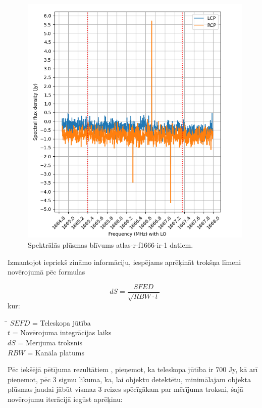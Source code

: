 \begin{figure}[H]
\centering
\includegraphics[width=\textwidth]{images/created/atlas-r-1-flux.png}
\caption{Spektrālās plūsmas blīvums atlas-r-f1666-ir-1 datiem.}
\label{fig:atlas-1-flux}
\end{figure}



Izmantojot iepriekš zināmo informāciju, iespējams aprēķināt trokšņa līmeni novērojumā pēc formulas


\begin{equation}
dS = \frac{SFED}{\sqrt{RBW \cdot t}} \tag{2.3.1}\label{eq:2.3.1} 
\end{equation}
kur: 
\begin{tabbing}
\phantom{\hspace{15mm}}\= \kill
$SEFD$\> = Teleskopa jūtība \\
$t$\>   = Novērojuma integrācijas laiks \\
$dS$\>   = Mērījuma troksnis \\
$RBW$\> = Kanāla platums\\

\end{tabbing}

Pēc iekšējā pētījuma rezultātiem \cite{telescope-sefd}, pieņemot, ka teleskopa jūtība ir 700 Jy, kā arī pieņemot, pēc 3 sigmu likuma, ka, lai objektu detektētu, minimālajam objekta plūsmas jaudai jābūt vismaz 3 reizes spēcīgākam par mērījuma troksni, šajā novērojumu iterācijā iegūst aprēķinu:



